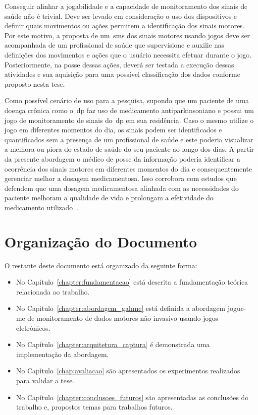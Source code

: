 Conseguir alinhar a jogabilidade e a capacidade de monitoramento dos sinais de saúde não é trivial. Deve ser levado em consideração o uso dos dispositivos e definir quais movimentos ou ações permitem a identificação dos sinais motores. Por este motivo, a proposta de um~\ac{sms} dos sinais motores usando jogos deve ser acompanhada de um profissional de saúde que supervisione e auxilie nas definições dos movimentos e ações que o usuário necessita efetuar durante o jogo. Posteriormente, na posse dessas ações, deverá ser testada a execução dessas atividades e sua aquisição para uma possível classificação dos dados conforme proposto nesta tese.

Como possível cenário de uso para a pesquisa, supondo que um paciente de uma doença crônica como o~\ac{dp} faz uso de medicamento antiparkinsoniano e possui um jogo de monitoramento de sinais do~\ac{dp} em sua residência. Caso o mesmo utilize o jogo em diferentes momentos do dia, os sinais podem ser identificados e quantificados sem a presença de um profissional de saúde e este poderia visualizar a melhora ou piora do estado de saúde do seu paciente ao longo dos dias. A partir da presente abordagem o médico de posse da informação poderia identificar a ocorrência dos sinais motores em diferentes momentos do dia e consequentemente gerenciar melhor a dosagem medicamentosa. Isso corrobora com estudos que defendem que uma dosagem medicamentosa alinhada com as necessidades do paciente melhoram a qualidade de vida e prolongam a efetividade do medicamento utilizado~\cite{rodrigues2006}.

\section{Organização do Documento}
O restante deste documento está organizado da seguinte forma:
\begin{itemize}
	\item No Capítulo~\ref{chapter:fundamentacao} está descrita a fundamentação teórica relacionada ao trabalho.
	\item No Capítulo~\ref{chapter:abordagem_gahme} está definida a abordagem \ac{jogue-me} de monitoramento de dados motores não invasivo usando jogos eletrônicos.
	\item No Capítulo~\ref{chapter:arquitetura_captura} é demonstrada uma implementação da abordagem.
	\item No Capítulo~\ref{chap:avaliacao} são apresentados os experimentos realizados para validar a tese.
	\item No Capítulo~\ref{chapter:conclusoes_futuros} são apresentadas as conclusões do trabalho e, propostos temas para trabalhos futuros.
\end{itemize}
